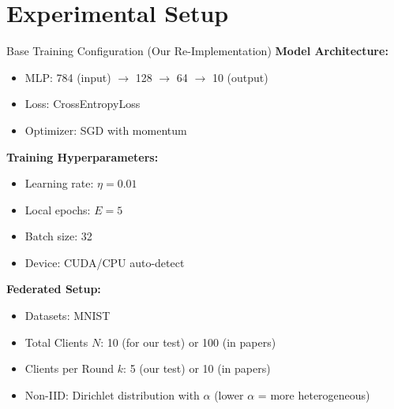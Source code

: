 \documentclass{beamer}
\begin{document}
\section{Experimental Setup}

\begin{frame}{Base Training Configuration (Our Re-Implementation)}
\textbf{Model Architecture:}
\begin{itemize}
\item MLP: 784 (input) $\to$ 128 $\to$ 64 $\to$ 10 (output)
\item Loss: CrossEntropyLoss
\item Optimizer: SGD with momentum
\end{itemize}

\textbf{Training Hyperparameters:}
\begin{itemize}
\item Learning rate: $\eta = 0.01$
\item Local epochs: $E = 5$
\item Batch size: 32
\item Device: CUDA/CPU auto-detect
\end{itemize}

\textbf{Federated Setup:}
\begin{itemize}
\item Datasets: MNIST
\item Total Clients $N$: 10 (for our test) or 100 (in papers)
\item Clients per Round $k$: 5 (our test) or 10 (in papers)
\item Non-IID: Dirichlet distribution with $\alpha$ (lower $\alpha$ = more heterogeneous)
\end{itemize}
\end{frame}
\end{document}
